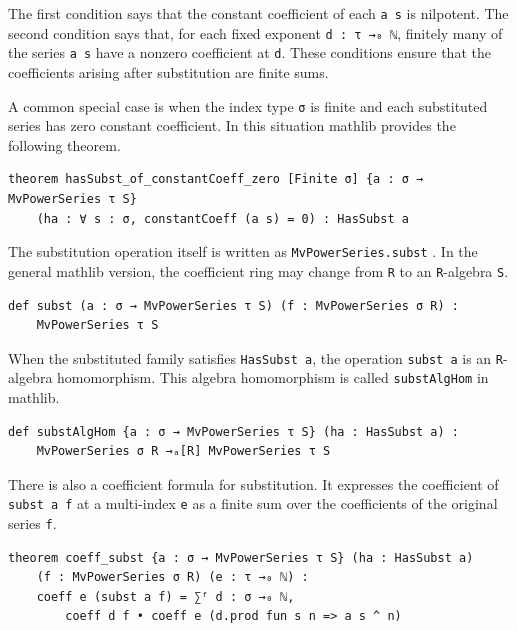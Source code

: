 The first condition says that the constant coefficient of each
\lstinline|a s| is nilpotent.  The second condition says that, for each
fixed exponent \lstinline|d : τ →₀ ℕ|, finitely many of the series
\lstinline|a s| have a nonzero coefficient at \lstinline|d|.  These
conditions ensure that the coefficients arising after substitution are
finite sums.

A common special case is when the index type \lstinline|σ| is finite and
each substituted series has zero constant coefficient.  In this situation
mathlib provides the following theorem.

\begin{lstlisting}
theorem hasSubst_of_constantCoeff_zero [Finite σ] {a : σ → MvPowerSeries τ S}
    (ha : ∀ s : σ, constantCoeff (a s) = 0) : HasSubst a
\end{lstlisting}

The substitution operation itself is written as
\lstinline|MvPowerSeries.subst|
\href{https://leanprover-community.github.io/mathlib4_docs/Mathlib/RingTheory/MvPowerSeries/Substitution.html#MvPowerSeries.subst}{\faExternalLink}
.  In
the general mathlib version, the coefficient ring may change from
\lstinline|R| to an \lstinline|R|-algebra \lstinline|S|.

\begin{lstlisting}
def subst (a : σ → MvPowerSeries τ S) (f : MvPowerSeries σ R) :
    MvPowerSeries τ S
\end{lstlisting}

When the substituted family satisfies \lstinline|HasSubst a|, the
operation \lstinline|subst a| is an
\lstinline|R|-algebra homomorphism.  This algebra homomorphism is called
\lstinline|substAlgHom|
\href{https://leanprover-community.github.io/mathlib4_docs/Mathlib/RingTheory/MvPowerSeries/Substitution.html#MvPowerSeries.substAlgHom}{\faExternalLink}
in mathlib.

\begin{lstlisting}
def substAlgHom {a : σ → MvPowerSeries τ S} (ha : HasSubst a) :
    MvPowerSeries σ R →ₐ[R] MvPowerSeries τ S
\end{lstlisting}

There is also a coefficient formula for substitution.  It expresses the
coefficient of \lstinline|subst a f| at a multi-index \lstinline|e| as a
finite sum over the coefficients of the original series \lstinline|f|.

\begin{lstlisting}
theorem coeff_subst {a : σ → MvPowerSeries τ S} (ha : HasSubst a)
    (f : MvPowerSeries σ R) (e : τ →₀ ℕ) :
    coeff e (subst a f) = ∑ᶠ d : σ →₀ ℕ,
        coeff d f • coeff e (d.prod fun s n => a s ^ n)
\end{lstlisting}

